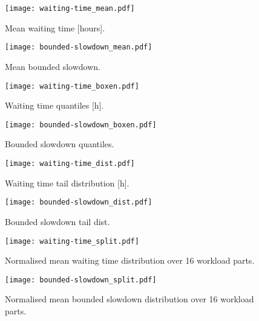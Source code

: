 \documentclass[runningheads]{llncs}
\begin{document}
\begin{figure}[p]
  \centering
  \begin{minipage}[b]{0.49\linewidth}
    \setlength{}
    \texttt{[image: waiting-time\_mean.pdf]}
    \caption{Mean waiting time [hours].}
    \label{fig:waiting-time_mean}
  \end{minipage}
  \begin{minipage}[b]{0.49\linewidth}
    \setlength{}
    \texttt{[image: bounded-slowdown\_mean.pdf]}
    \caption{Mean bounded slowdown.}
    \label{fig:bounded-slowdown_mean}
  \end{minipage}
\end{figure}
\begin{figure}[p]
  \centering
  \begin{minipage}[b]{0.49\linewidth}
    \setlength{}
    \texttt{[image: waiting-time\_boxen.pdf]}
    \caption{Waiting time quantiles [h].}
    \label{fig:waiting-time_boxen}
  \end{minipage}
  \begin{minipage}[b]{0.49\linewidth}
    \setlength{}
    \texttt{[image: bounded-slowdown\_boxen.pdf]}
    \caption{Bounded slowdown quantiles.}
    \label{fig:bounded-slowdown_boxen}
  \end{minipage}
\end{figure}
\begin{figure}[p]
  \centering
  \begin{minipage}[b]{0.49\linewidth}
    \setlength{}
    \texttt{[image: waiting-time\_dist.pdf]}
    \caption{Waiting time tail distribution [h].}
    \label{fig:waiting-time_dist}
  \end{minipage}
  \begin{minipage}[b]{0.49\linewidth}
    \setlength{}
    \texttt{[image: bounded-slowdown\_dist.pdf]}
    \caption{Bounded slowdown tail dist.}
    \label{fig:bounded-slowdown_dist}
  \end{minipage}
\end{figure}
\begin{figure}[p]
  \centering
  \begin{minipage}[b]{0.49\linewidth}
    \setlength{}
    \centering
    \texttt{[image: waiting-time\_split.pdf]}
    \caption{Normalised mean waiting time \mbox{distribution} over 16 workload parts.}
    \label{fig:waiting-time_split}
  \end{minipage}
  \begin{minipage}[b]{0.49\linewidth}
    \setlength{}
    \centering
    \texttt{[image: bounded-slowdown\_split.pdf]}
    \caption{Normalised mean bounded slowdown distribution over 16 workload parts.}
    \label{fig:bounded-slowdown_split}
  \end{minipage}
\end{figure}
\end{document}
